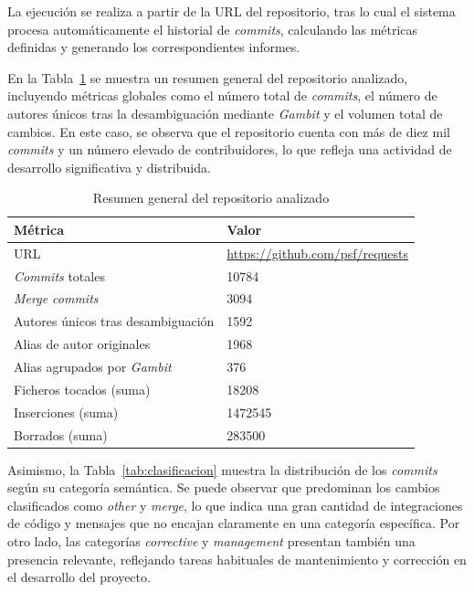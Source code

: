 \documentclass[a4paper, 12pt]{book}
\begin{document}
La ejecución se realiza a partir de la URL del repositorio, tras lo cual el sistema procesa automáticamente el historial de \emph{commits}, calculando las métricas definidas y generando los correspondientes informes.

En la Tabla~\ref{tab:resumen_repo} se muestra un resumen general del repositorio analizado, incluyendo métricas globales como el número total de \emph{commits}, el número de autores únicos tras la desambiguación mediante \emph{Gambit} y el volumen total de cambios. En este caso, se observa que el repositorio cuenta con más de diez mil \emph{commits} y un número elevado de contribuidores, lo que refleja una actividad de desarrollo significativa y distribuida.

\begin{table}[H]
\centering
\small
\begin{tabular}{|p{5cm}|p{7cm}|}
\hline
\textbf{Métrica} & \textbf{Valor} \\
\hline

URL & \url{https://github.com/psf/requests} \\
\hline

\emph{Commits} totales & 10784 \\
\hline

\emph{Merge commits} & 3094 \\
\hline

Autores únicos tras desambiguación & 1592 \\
\hline

Alias de autor originales & 1968 \\
\hline

Alias agrupados por \emph{Gambit} & 376 \\
\hline

Ficheros tocados (suma) & 18208 \\
\hline

Inserciones (suma) & 1472545 \\
\hline

Borrados (suma) & 283500 \\
\hline

\end{tabular}
\caption{Resumen general del repositorio analizado}
\label{tab:resumen_repo}
\end{table}

Asimismo, la Tabla~\ref{tab:clasificacion} muestra la distribución de los \emph{commits} según su categoría semántica. Se puede observar que predominan los cambios clasificados como \emph{other} y \emph{merge}, lo que indica una gran cantidad de integraciones de código y mensajes que no encajan claramente en una categoría específica. Por otro lado, las categorías \emph{corrective} y \emph{management} presentan también una presencia relevante, reflejando tareas habituales de mantenimiento y corrección en el desarrollo del proyecto.
\end{document}
